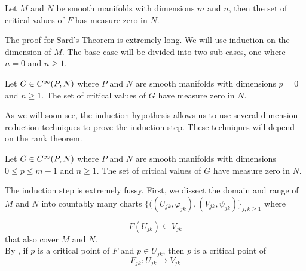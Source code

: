 \documentclass[../main-manifolds.tex]{subfiles}
\begin{document}

\begin{wts}
    Let $M$ and $N$ be smooth manifolds with dimensions $m$ and $n$, then the set of critical values of $F$ has measure-zero in $N$.
\end{wts}
The proof for Sard's Theorem is extremely long. We will use induction on the dimension of $M$. The base case will be divided into two sub-cases, one where $n=0$ and $n\geq 1$.\\


\begin{step}[Base case: $m = 0$]
    Let $G\in\cinf[P,N]$ where $P$ and $N$ are smooth manifolds with dimensions $p = 0$ and $n\geq 1$. The set of critical values of $G$ have measure zero in $N$.
\end{step}


As we will soon see, the induction hypothesis allows  us to use several dimension reduction techniques to prove the induction step. These techniques will depend on the rank theorem.
\begin{step}
    Let $G\in\cinf[P,N]$ where $P$ and $N$ are smooth manifolds with dimensions $0\leq p\leq m-1$ and $n\geq 1$. The set of critical values of $G$ have measure zero in $N$.
\end{step}

The induction step is extremely fussy. First, we dissect the domain and range of $M$ and $N$ into countably many charts $\{((U_{jk}, \varphi_{jk}),(V_{jk},\psi_{jk})\}_{j,k\geq 1}$ where

\begin{equation}\label{lee-sards-Ujk-Vjk-spec}
    F(U_{jk})\subseteq V_{jk}    
\end{equation}
that also cover $M$ and $N$. \\

By , if $p$ is a critical point of $F$ and $p\in U_{jk}$, then $p$ is a critical point of 
\begin{equation}\label{lee-sards-Fjk-spec}
    F_{jk}: U_{jk}\to V_{jk}
\end{equation}
\end{document}
